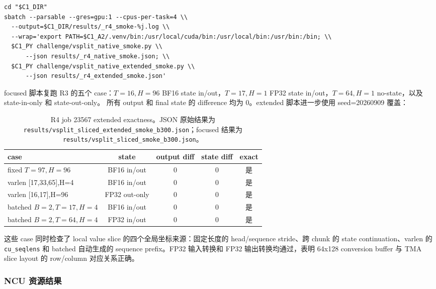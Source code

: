 \documentclass[11pt,a4paper,fontset=none]{ctexart}
\newcommand{\code}[1]{\texttt{#1}}
\begin{document}
\begin{lstlisting}
cd "$C1_DIR"
sbatch --parsable --gres=gpu:1 --cpus-per-task=4 \\
  --output=$C1_DIR/results/_r4_smoke-%j.log \\
  --wrap='export PATH=$C1_A2/.venv/bin:/usr/local/cuda/bin:/usr/local/bin:/usr/bin:/bin; \\
  $C1_PY challenge/vsplit_native_smoke.py \\
      --json results/_r4_native_smoke.json; \\
  $C1_PY challenge/vsplit_native_extended_smoke.py \\
      --json results/_r4_extended_smoke.json'
\end{lstlisting}

focused 脚本复跑 R3 的五个 case：\(T=16,H=96\) BF16 state in/out，\(T=17,H=1\)
FP32 state in/out，\(T=64,H=1\) no-state，以及 state-in-only 和 state-out-only。
所有 output 和 final state 的 difference 均为 0。extended 脚本进一步使用
seed=20260909 覆盖：

\begin{table}[htbp]
\centering
\small
\begin{tabular}{l c c c c}
\toprule
case & state & output diff & state diff & exact \\
\midrule
fixed \(T=97,H=96\) & BF16 in/out & 0 & 0 & 是 \\
varlen [17,33,65],H=4 & BF16 in/out & 0 & 0 & 是 \\
varlen [16,17],H=96 & FP32 out-only & 0 & 0 & 是 \\
batched \(B=2,T=17,H=4\) & BF16 in/out & 0 & 0 & 是 \\
batched \(B=2,T=64,H=4\) & FP32 in/out & 0 & 0 & 是 \\
\bottomrule
\end{tabular}
\caption{R4 job 23567 extended exactness。JSON 原始结果为
\code{results/vsplit\_sliced\_extended\_smoke\_b300.json}；focused 结果为
\code{results/vsplit\_sliced\_smoke\_b300.json}。}
\end{table}

这些 case 同时检查了 local value slice 的四个全局坐标来源：固定长度的
head/sequence stride、跨 chunk 的 state continuation、varlen 的
\code{cu\_seqlens} 和 batched 自动生成的 sequence prefix。FP32 输入转换和
FP32 输出转换均通过，表明 64x128 conversion buffer 与 TMA slice
layout 的 row/column 对应关系正确。

\subsubsection{NCU 资源结果}
\end{document}
